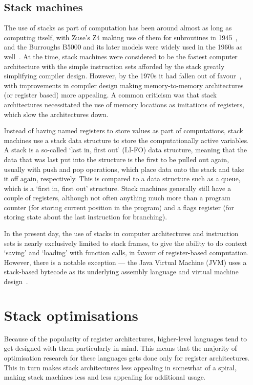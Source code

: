 \subsection{Stack machines}

The use of stacks as part of computation has been around almost as long as
computing itself, with Zuse's Z4 making use of them for subroutines in
1945~\cite{Speiser2000KZZ}, and the Burroughs B5000 and its later models were
widely used in the 1960s as well~\cite{Organick2014Computer}. At the time, stack
machines were considered to be the fastest computer architecture with the simple
instruction sets afforded by the stack greatly simplifying compiler design.
However, by the 1970s it had fallen out of favour~\cite{Myers1977CAS}, with
improvements in compiler design making memory-to-memory architectures (or
register based) more appealing. A common criticism was that stack architectures
necessitated the use of memory locations as imitations of registers, which slow
the architectures down.

Instead of having named registers to store values as part of computations, stack
machines use a stack data structure to store the computationally active
variables. A stack is a so-called `last in, first out' (LI-FO) data structure,
meaning that the data that was last put into the structure is the first to be
pulled out again, usually with push and pop operations, which place data onto
the stack and take it off again, respectively. This is compared to a data
structure such as a queue, which is a `first in, first out' structure. Stack
machines generally still have a couple of registers, although not often anything
much more than a program counter (for storing current position in the program)
and a flags register (for storing state about the last instruction for
branching).

In the present day, the use of stacks in computer architectures and instruction
sets is nearly exclusively limited to stack frames, to give the ability to do
context `saving' and `loading' with function calls, in favour of register-based
computation. However, there is a notable exception --- the Java Virtual Machine
(JVM) uses a stack-based bytecode as its underlying assembly language and
virtual machine design~\cite{Schoeberl2005Design}.

\section{Stack optimisations}
Because of the popularity of register architectures, higher-level languages tend
to get designed with them particularly in mind. This means that the majority of
optimisation research for these languages gets done only for register
architectures. This in turn makes stack architectures less appealing in somewhat
of a spiral, making stack machines less and less appealing for additional usage.

